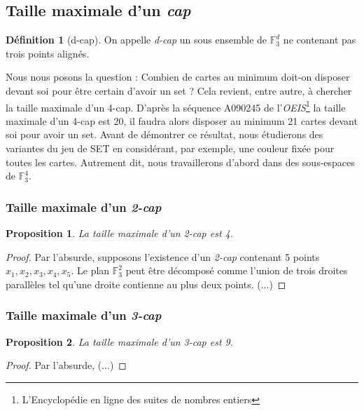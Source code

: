 \documentclass[a4paper,12pt,titlepage]{article}
\theoremstyle{plain}
\newtheorem{prop}{Proposition}
\newcommand{\Ftrois}[1]{\mathbb{F}^#1_3}
\theoremstyle{definition}
\newtheorem{defi}{Définition}
\begin{document}
\subsection{Taille maximale d'un \emph{cap}}
\begin{defi}[d-cap]
On appelle \emph{d-cap} un sous ensemble de  $\Ftrois{d}$ ne contenant pas trois points alignés. \\
\end{defi}
Nous nous posons la question : Combien de cartes au minimum doit-on disposer devant soi pour être certain d'avoir un set ?
Cela revient, entre autre, à chercher la taille maximale d'un 4-cap. D'après la séquence A090245 de l'\emph{OEIS}\footnote{L'Encyclopédie en ligne des suites de nombres entiers} la taille maximale d'un 4-cap est 20, il faudra alors disposer au minimum 21 cartes devant soi pour avoir un set.
Avant de démontrer ce résultat, nous étudierons des variantes du jeu de SET en considérant, par exemple, une couleur fixée pour toutes les cartes. Autrement dit, nous travaillerons d'abord dans des sous-espaces de  $\Ftrois{4}$.

\subsubsection{Taille maximale d'un \emph{2-cap}}
\begin{prop}
La taille maximale d'un \emph{2-cap} est 4.
\end{prop}
\begin{proof}
Par l'absurde, supposons l'existence d'un \emph{2-cap} contenant 5 points $x_1,x_2,x_3,x_4,x_5$.
Le plan  $\Ftrois{2}$ peut être décomposé comme l'union de trois droites parallèles tel qu'une droite contienne au plus deux points.  (...)
\end{proof}

\subsubsection{Taille maximale d'un \emph{3-cap}}
\begin{prop} \label{prop:3cap}
La taille maximale d'un \emph{3-cap} est 9.
\end{prop}
\begin{proof}
Par l'absurde, (...)
\end{proof}
\end{document}
